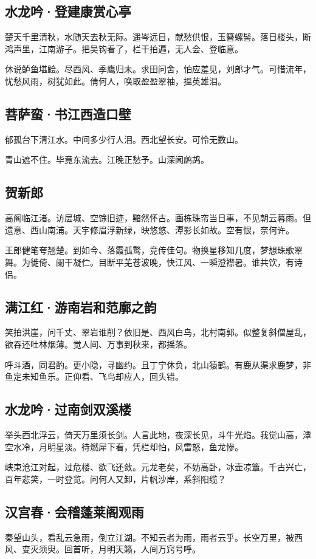 \documentclass[a5paper]{ctexart}
\begin{document}
	\subsection{水龙吟·登建康赏心亭}
	楚天千里清秋，水随天去秋无际。遥岑远目，献愁供恨，玉簪螺髻。落日楼头，断鸿声里，江南游子。把吴钩看了，栏干拍遍，无人会、登临意。
	
	休说鲈鱼堪鲙。尽西风、季鹰归未。求田问舍，怕应羞见，刘郎才气。可惜流年，忧愁风雨，树犹如此。倩何人，唤取盈盈翠袖，搵英雄泪。
	
	\subsection{菩萨蛮·书江西造口壁}
	郁孤台下清江水。中间多少行人泪。西北望长安。可怜无数山。
	
	青山遮不住。毕竟东流去。江晚正愁予。山深闻鹧鸪。
	
	\subsection{贺新郎}
	高阁临江渚。访层城、空馀旧迹，黯然怀古。画栋珠帘当日事，不见朝云暮雨。但遗意、西山南浦。天宇修眉浮新绿，映悠悠、潭影长如故。空有恨，奈何许。
	
	王郎健笔夸翘楚。到如今、落霞孤鹜，竞传佳句。物换星移知几度，梦想珠歌翠舞。为徙倚、阑干凝伫。目断平芜苍波晚，快江风、一瞬澄襟暑。谁共饮，有诗侣。
	
	\subsection{满江红·游南岩和范廓之韵}
	笑拍洪崖，问千丈、翠岩谁削？依旧是、西风白鸟，北村南郭。似整复斜僧屋乱，欲吞还吐林烟薄。觉人间、万事到秋来，都摇落。
	
	呼斗酒，同君酌。更小隐，寻幽约。且丁宁休负，北山猿鹤。有鹿从渠求鹿梦，非鱼定未知鱼乐。正仰看、飞鸟却应人，回头错。
	
	\subsection{水龙吟·过南剑双溪楼}
	举头西北浮云，倚天万里须长剑。人言此地，夜深长见，斗牛光焰。我觉山高，潭空水冷，月明星淡。待燃犀下看，凭栏却怕，风雷怒，鱼龙惨。
	
	峡束沧江对起，过危楼、欲飞还敛。元龙老矣，不妨高卧，冰壶凉簟。千古兴亡，百年悲笑，一时登览。问何人又卸，片帆沙岸，系斜阳缆？
	
	\subsection{汉宫春·会稽蓬莱阁观雨}
	秦望山头，看乱云急雨，倒立江湖。不知云者为雨，雨者云乎。长空万里，被西风、变灭须臾。回首听，月明天籁，人间万窍号呼。
	
\end{document}
